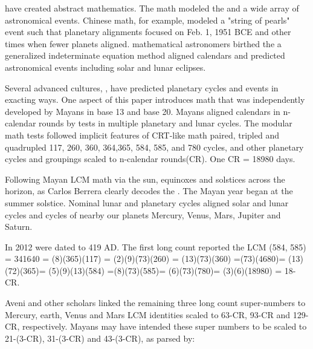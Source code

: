 \documentclass[12pt]{article}
\begin{document}
 have created abstract mathematics. The math modeled the  and a wide array of astronomical events.  Chinese math, for example, modeled a "string of pearls" event such that planetary alignments focused on Feb. 1, 1951 BCE and other times when fewer planets aligned.   mathematical astronomers birthed the  a generalized indeterminate equation method aligned calendars and predicted astronomical events including solar and lunar eclipses. 

Several advanced cultures, , have predicted planetary cycles and events in exacting ways. One aspect of this paper introduces  math that was independently developed by Mayans in base 13 and base 20. Mayans aligned calendars in n-calendar rounds by  tests in multiple planetary and lunar cycles. The modular math tests followed implicit features of CRT-like math paired, tripled and quadrupled 117, 260, 360, 364,365, 584, 585, and 780 cycles, and other planetary cycles and groupings scaled to n-calendar rounds(CR). One CR =  18980 days.

Following Mayan LCM math via the sun, equinoxes and solstices across the horizon, as  Carlos Berrera clearly decodes the . The Mayan year began at the summer solstice. Nominal lunar and planetary  cycles aligned solar and lunar cycles and cycles of nearby our planets Mercury, Venus, Mars, Jupiter and Saturn.  

In 2012  were dated to 419 AD. The first long count reported the LCM (584, 585) = 341640 = (8)(365)(117) = (2)(9)(73)(260) = (13)(73)(360) =(73)(4680)= (13)(72)(365)= (5)(9)(13)(584) =(8)(73)(585)=  (6)(73)(780)= (3)(6)(18980) = 18-CR.  

Aveni and other scholars linked the remaining three  long count super-numbers to Mercury, earth, Venus and Mars LCM identities scaled to 63-CR, 93-CR and 129-CR, respectively.  Mayans may have intended these super numbers to be scaled to 21-(3-CR), 31-(3-CR) and 43-(3-CR), as parsed by: 
\end{document}
